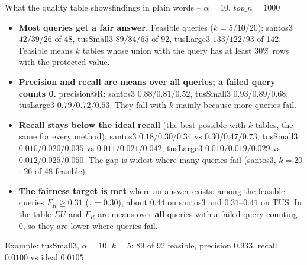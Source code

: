 \documentclass[aspectratio=169,10pt]{beamer}
\newcommand{\highlight}[1]{{\color{Cat1}\bfseries #1}}
\begin{document}
\begin{frame}{What the quality table shows}{findings in plain words -- $\alpha{=}10$, $top\_n{=}1000$}
\small
\begin{itemize}\setlength\itemsep{4pt}
\item \highlight{Most queries get a fair answer.} Feasible queries ($k{=}5/10/20$): santos3 $42/39/26$ of 48, tusSmall3 $89/84/65$ of 92, tusLarge3 $133/122/93$ of 142. Feasible means $k$ tables whose union with the query has at least $30\%$ rows with the protected value.
\item \highlight{Precision and recall are means over all queries; a failed query counts 0.} precision@R: santos3 $0.88/0.81/0.52$, tusSmall3 $0.93/0.89/0.68$, tusLarge3 $0.79/0.72/0.53$. They fall with $k$ mainly because more queries fail.
\item \highlight{Recall stays below the ideal recall} (the best possible with $k$ tables, the same for every method): santos3 $0.18/0.30/0.34$ vs $0.30/0.47/0.73$, tusSmall3 $0.010/0.020/0.035$ vs $0.011/0.021/0.042$, tusLarge3 $0.010/0.019/0.029$ vs $0.012/0.025/0.050$. The gap is widest where many queries fail (santos3, $k{=}20$: 26 of 48 feasible).
\item \highlight{The fairness target is met} where an answer exists: among the feasible queries $F_R\ge0.31$ ($\tau{=}0.30$), about $0.44$ on santos3 and $0.31$--$0.41$ on TUS. In the table $\Sigma U$ and $F_R$ are means over \textbf{all} queries with a failed query counting 0, so they are lower where queries fail.
\end{itemize}
\vspace{2pt}
{\footnotesize\color{Muted} Example: tusSmall3, $\alpha{=}10$, $k{=}5$: 89 of 92 feasible, precision $0.933$, recall $0.0100$ vs ideal $0.0105$.}
\end{frame}
\end{document}
